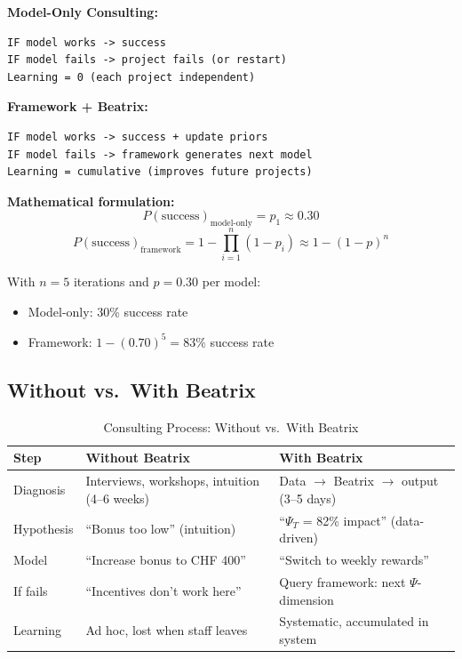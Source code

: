 \begin{tcolorbox}[colback=yellow!5!white, colframe=orange!75!black,
    title=\textbf{Model-Only vs.\ Framework + Beatrix}]

\textbf{Model-Only Consulting:}
\begin{verbatim}
IF model works -> success
IF model fails -> project fails (or restart)
Learning = 0 (each project independent)
\end{verbatim}

\textbf{Framework + Beatrix:}
\begin{verbatim}
IF model works -> success + update priors
IF model fails -> framework generates next model
Learning = cumulative (improves future projects)
\end{verbatim}

\textbf{Mathematical formulation:}
\begin{equation}
P(\text{success})_{\text{model-only}} = p_1 \approx 0.30
\end{equation}
\begin{equation}
P(\text{success})_{\text{framework}} = 1 - \prod_{i=1}^{n} (1 - p_i) \approx 1 - (1-p)^n
\end{equation}

With $n = 5$ iterations and $p = 0.30$ per model:
\begin{itemize}[nosep]
    \item Model-only: 30\% success rate
    \item Framework: $1 - (0.70)^5 = 83\%$ success rate
\end{itemize}

\end{tcolorbox}

\subsection{Without vs.\ With Beatrix}

\begin{table}[htbp]
\centering
\caption{Consulting Process: Without vs.\ With Beatrix}
\label{tab:beatrix-comparison}
\renewcommand{\arraystretch}{1.3}
\begin{tabular}{@{}p{3cm}p{5cm}p{5cm}@{}}
\toprule
\textbf{Step} & \textbf{Without Beatrix} & \textbf{With Beatrix} \\
\midrule
Diagnosis & Interviews, workshops, intuition (4--6 weeks) & Data $\rightarrow$ Beatrix $\rightarrow$ output (3--5 days) \\
Hypothesis & ``Bonus too low'' (intuition) & ``$\Psi_T$ = 82\% impact'' (data-driven) \\
Model & ``Increase bonus to CHF 400'' & ``Switch to weekly rewards'' \\
If fails & ``Incentives don't work here'' & Query framework: next $\Psi$-dimension \\
Learning & Ad hoc, lost when staff leaves & Systematic, accumulated in system \\
\bottomrule
\end{tabular}
\end{table}


